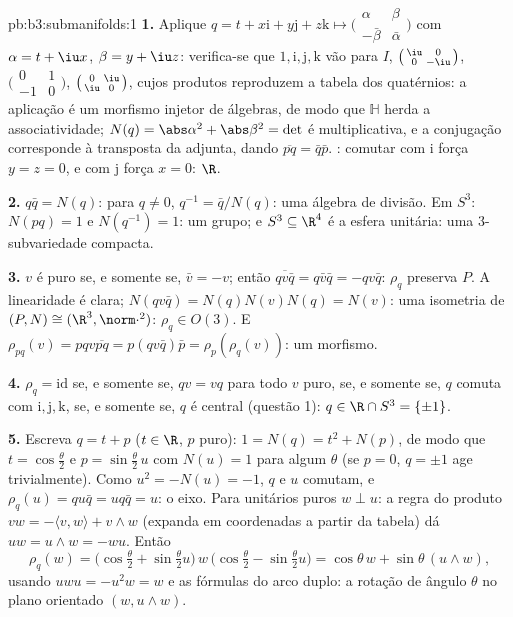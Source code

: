 \begin{solution}{pb:b3:submanifolds:1}
\textbf{1.} Aplique $q = t + x\mathrm i + y\mathrm j + z\mathrm k
\mapsto \bigl(\begin{smallmatrix}\alpha & \beta\\ -\bar\beta
& \bar\alpha\end{smallmatrix}\bigr)$ com $\alpha = t + \iu
x$, $\beta = y + \iu z$: verifica-se que $1, \mathrm i,
\mathrm j, \mathrm k$ vão para $I$, $\bigl(\begin{smallmatrix}
\iu & 0\\ 0 & -\iu\end{smallmatrix}\bigr)$,
$\bigl(\begin{smallmatrix}0 & 1\\ -1 &
0\end{smallmatrix}\bigr)$, $\bigl(\begin{smallmatrix}0 &
\iu\\ \iu & 0\end{smallmatrix}\bigr)$, cujos produtos
reproduzem a tabela dos quatérnios: a aplicação é um morfismo injetor
de álgebras, de modo que $\mathbb H$ herda a associatividade;
$N(q) = \abs\alpha^2 + \abs\beta^2 = \det$ é multiplicativa,
e a conjugação corresponde à transposta da adjunta,
dando $\overline{pq} = \bar q\bar p$. : comutar
com $\mathrm i$ força $y = z = 0$, e com $\mathrm j$ força
$x = 0$: $\R$.

\textbf{2.} $q\bar q = N(q)$: para $q \neq 0$, $q^{-1} = \bar
q/N(q)$: uma álgebra de divisão. Em $S^3$: $N(pq) = 1$ e
$N(q^{-1}) = 1$: um grupo; e $S^3 \subseteq \R^4$ é a
esfera unitária: uma $3$-subvariedade compacta.

\textbf{3.} $v$ é puro se, e somente se, $\bar v = -v$; então
$\overline{qv\bar q} = q\bar v\bar q = -qv\bar q$: $\rho_q$
preserva $P$. A linearidade é clara; $N(qv\bar q) =
N(q)N(v)N(q) = N(v)$: uma isometria de $(P, N) \cong (\R^3,
\norm\cdot^2)$: $\rho_q \in O(3)$. E $\rho_{pq}(v) =
pqv\overline{pq} = p(qv\bar q)\bar p =
\rho_p(\rho_q(v))$: um morfismo.

\textbf{4.} $\rho_q = \mathrm{id}$ se, e somente se, $qv = vq$ para todo $v$ puro,
se, e somente se, $q$ comuta com $\mathrm i, \mathrm j, \mathrm k$,
se, e somente se, $q$ é central (questão 1): $q \in \R\cap S^3 =
\{\pm1\}$.

\textbf{5.} Escreva $q = t + p$ ($t \in \R$, $p$ puro): $1 =
N(q) = t^2 + N(p)$, de modo que $t = \cos\frac\theta2$ e $p =
\sin\frac\theta2\,u$ com $N(u) = 1$ para algum $\theta$
(se $p = 0$, $q = \pm1$ age trivialmente). Como $u^2 = -N(u)
= -1$, $q$ e $u$ comutam, e $\rho_q(u) = qu\bar q =
uq\bar q = u$: o eixo. Para unitários puros $w \perp u$: a
regra do produto $vw = -\langle v, w\rangle + v\wedge w$
(expanda em coordenadas a partir da tabela) dá $uw = u\wedge w
= -wu$. Então
\[
\rho_q(w) = \bigl(\cos\tfrac\theta2 +
\sin\tfrac\theta2u\bigr)\,w\,\bigl(\cos\tfrac\theta2 -
\sin\tfrac\theta2u\bigr)
= \cos\theta\,w + \sin\theta\,(u\wedge w),
\]
usando $uwu = -u^2w = w$ e as fórmulas do arco duplo: a
rotação de ângulo $\theta$ no plano orientado $(w,
u\wedge w)$.


\end{solution}
